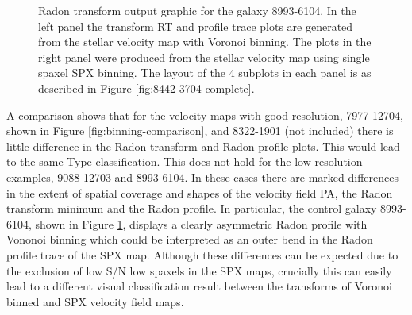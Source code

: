 \begin{figure}
    \caption{Radon transform output graphic for the galaxy 8993-6104. In the left panel the transform RT and profile trace plots are generated from the stellar velocity map with Voronoi binning. The plots in the right panel were produced from the stellar velocity map using single spaxel SPX binning. The layout of the 4 subplots in each panel is as described in Figure \ref{fig:8442-3704-complete}.}
    \label{fig:binning-comparison2}
\end{figure}

A comparison shows that for the velocity maps with good resolution, 7977-12704, shown in Figure \ref{fig:binning-comparison}, and 8322-1901 (not included) there is little difference in the Radon transform and Radon profile plots. This would lead to the same Type classification. This does not hold for the low resolution examples, 9088-12703 and 8993-6104. In these cases there are marked differences in the extent of spatial coverage and shapes of the velocity field PA, the Radon transform minimum and the Radon profile. In particular, the control galaxy 8993-6104, shown in Figure \ref{fig:binning-comparison2}, displays a clearly asymmetric Radon profile with Vononoi binning which could be interpreted as an outer bend in the Radon profile trace of the SPX map. Although these differences can be expected due to the exclusion of low S/N low spaxels in the SPX maps, crucially this can easily lead to a different visual classification result between the transforms of Voronoi binned and SPX velocity field maps.    
